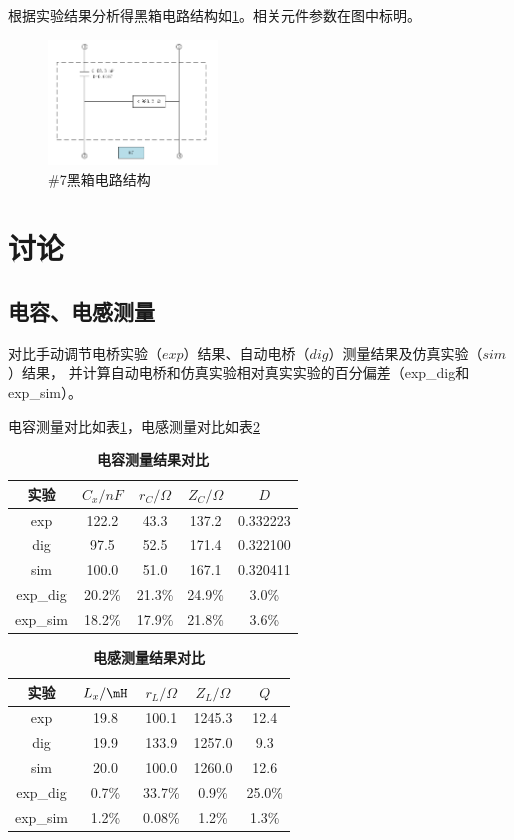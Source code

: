 \documentclass[10pt,a4paper,twocolumn,twoside,UTF8]{ctexart}
\begin{document}
		根据实验结果分析得黑箱电路结构如\ref{fig:3}。相关元件参数在图中标明。
		\begin{figure}[htbp]
			\centering
			\includegraphics[width=0.4\textwidth]{attachments/fig.3.png}
			\caption{\#7黑箱电路结构}
			\label{fig:3}
		\end{figure}

\section{讨论}
	\subsection{电容、电感测量}
		对比手动调节电桥实验（$exp$）结果、自动电桥（$dig$）测量结果及仿真实验（$sim$）结果，
		并计算自动电桥和仿真实验相对真实实验的百分偏差（exp\_dig和exp\_sim）。
		
		电容测量对比如表\ref{tab:5.1}，电感测量对比如表\ref{tab:5.2}
		\begin{table}[htbp]
			\centering
				\begin{tabular}{ccccc}
					\toprule
					实验	&$C_x/ nF$	&$r_C/ \Omega$	&$Z_C/ \Omega$	&$D$ \\
					\midrule
					exp	&122.2	&43.3	&137.2	&0.332223	\\ 
					dig	&97.5	&52.5	&171.4	&0.322100	\\
					sim	&100.0	&51.0	&167.1	&0.320411	\\
					exp\_dig	&20.2\%	&21.3\%	&24.9\%	&3.0\%	\\
					exp\_sim	&18.2\%	&17.9\%	&21.8\%	&3.6\%	\\
					\bottomrule
				\end{tabular}
				\caption{\textbf{电容测量结果对比}}
				\label{tab:5.1}
		\end{table}
		\begin{table}[htbp]
			\centering
				\begin{tabular}{ccccc}
					\toprule
					实验	&$L_x/ \mH$	&$r_L/ \Omega$	&$Z_L/ \Omega$	&$Q$ \\
					\midrule
					exp	&19.8	&100.1	&1245.3	&12.4	\\
					dig	&19.9	&133.9	&1257.0	&9.3	\\
					sim	&20.0	&100.0	&1260.0	&12.6	\\
					exp\_dig	&0.7\%	&33.7\%	&0.9\%	&25.0\%	\\
					exp\_sim	&1.2\%	&0.08\%	&1.2\%	&1.3\%	\\
					\bottomrule
				\end{tabular}
				\caption{\textbf{电感测量结果对比}}
				\label{tab:5.2}
		\end{table}
\end{document}
